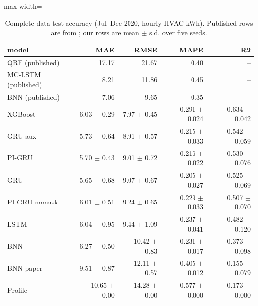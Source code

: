 \begin{table}[H]
\centering\small
\caption{Complete-data test accuracy (Jul--Dec 2020, hourly HVAC kWh). Published rows are from \citet{mahajan2024bnn}; our rows are mean $\pm$ s.d. over five seeds.}\label{tab:baseline}
\begin{adjustbox}{max width=\textwidth}
\begin{tabular}{lrrrr}
\toprule
model & MAE & RMSE & MAPE & R2 \\
\midrule
QRF (published) & 17.17 & 21.67 & 0.40 & -- \\
MC-LSTM (published) & 8.21 & 11.86 & 0.45 & -- \\
BNN (published) & 7.06 & 9.65 & 0.35 & -- \\
XGBoost & 6.03 $\pm$ 0.29 & 7.97 $\pm$ 0.45 & 0.291 $\pm$ 0.024 & 0.634 $\pm$ 0.042 \\
GRU-aux & 5.73 $\pm$ 0.64 & 8.91 $\pm$ 0.57 & 0.215 $\pm$ 0.033 & 0.542 $\pm$ 0.059 \\
PI-GRU & 5.70 $\pm$ 0.43 & 9.01 $\pm$ 0.72 & 0.216 $\pm$ 0.022 & 0.530 $\pm$ 0.076 \\
GRU & 5.65 $\pm$ 0.68 & 9.07 $\pm$ 0.67 & 0.205 $\pm$ 0.027 & 0.525 $\pm$ 0.069 \\
PI-GRU-nomask & 6.01 $\pm$ 0.51 & 9.24 $\pm$ 0.65 & 0.229 $\pm$ 0.033 & 0.507 $\pm$ 0.070 \\
LSTM & 6.04 $\pm$ 0.95 & 9.44 $\pm$ 1.09 & 0.237 $\pm$ 0.041 & 0.482 $\pm$ 0.120 \\
BNN & 6.27 $\pm$ 0.50 & 10.42 $\pm$ 0.83 & 0.231 $\pm$ 0.017 & 0.373 $\pm$ 0.098 \\
BNN-paper & 9.51 $\pm$ 0.87 & 12.11 $\pm$ 0.57 & 0.405 $\pm$ 0.012 & 0.155 $\pm$ 0.079 \\
Profile & 10.65 $\pm$ 0.00 & 14.28 $\pm$ 0.00 & 0.577 $\pm$ 0.000 & -0.173 $\pm$ 0.000 \\
\bottomrule
\end{tabular}
\end{adjustbox}
\end{table}
